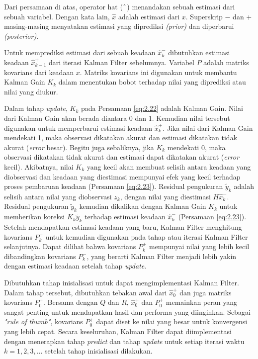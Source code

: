         Dari persamaan di atas, operator hat ($\string^$) menandakan sebuah estimasi dari sebuah variabel. Dengan kata lain, $\hat{x}$ adalah estimasi dari $x$. Superskrip $-$ dan $+$ masing-masing menyatakan estimasi yang diprediksi \textit{(prior)} dan diperbarui \textit{(posterior)}.
        
        Untuk memprediksi estimasi dari sebuah keadaan $\hat{x}^-_k$ dibutuhkan estimasi keadaan $\hat{x}^+_{k-1}$ dari iterasi Kalman Filter sebelumnya. Variabel $P$ adalah matriks kovarians dari keadaan $x$. Matriks kovarians ini digunakan untuk membantu Kalman Gain $K_k$ dalam menentukan bobot terhadap nilai yang diprediksi atau nilai yang diukur.
        
        Dalam tahap \textit{update}, $K_k$ pada Persamaan \ref{eq:2.22} adalah Kalman Gain. Nilai dari Kalman Gain akan berada diantara 0 dan 1. Kemudian nilai tersebut digunakan untuk memperbarui estimasi keadaan $\hat{x}^+_k$. Jika nilai dari Kalman Gain mendekati 1, maka observasi dikatakan akurat dan estimasi dikatakan tidak akurat (\textit{error} besar). Begitu juga sebaliknya, jika $K_k$ mendekati 0, maka observasi dikatakan tidak akurat dan estimasi dapat dikatakan akurat (\textit{error} kecil). Akibatnya, nilai $K_k$ yang kecil akan membuat selisih antara keadaan yang diobservasi dan keadaan yang diestimasi mempunyai efek yang kecil terhadap proses pembaruan keadaan (Persamaan \ref{eq:2.23}). Residual pengukuran $\tilde{y}_k$ adalah selisih antara nilai yang diobservasi $z_k$, dengan nilai yang diestimasi $H\hat{x}^-_k$. Residual pengukuran $\tilde{y}_k$ kemudian dikalikan dengan Kalman Gain $K_k$ untuk memberikan koreksi $K_k\tilde{y}_k$ terhadap estimasi keadaan $\hat{x}^-_k$ (Persamaan \ref{eq:2.23}). Setelah mendapatkan estimasi keadaan yang baru, Kalman Filter menghitung kovarians $P^+_k$ untuk kemudian digunakan pada tahap atau iterasi Kalman Filter selanjutnya. Dapat dilihat bahwa kovarians $P^+_k$ mempunyai nilai yang lebih kecil dibandingkan kovarians $P^-_k$, yang berarti Kalman Filter menjadi lebih yakin dengan estimasi keadaan setelah tahap \textit{update}.
        
        Dibutuhkan tahap inisialisasi untuk dapat mengimplementasi Kalman Filter. Dalam tahap tersebut, dibutuhkan tebakan awal dari $\hat{x}^+_0$ dan juga matriks kovarians $P^+_0$. Bersama dengan $Q$ dan $R$, $\hat{x}^+_0$ dan $P^+_0$ memainkan peran yang sangat penting untuk mendapatkan hasil dan performa yang diinginkan. Sebagai \textit{"rule of thumb"}, kovarians $P^+_0$ dapat diset ke nilai yang besar untuk konvergensi yang lebih cepat. Secara keseluruhan, Kalman Filter dapat diimplementasi dengan menerapkan tahap \textit{predict} dan tahap \textit{update} untuk setiap iterasi waktu $k = 1, 2, 3, ...$ setelah tahap inisialisasi dilakukan.
        
